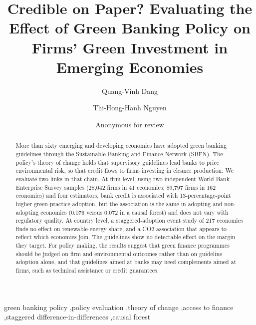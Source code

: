 \documentclass[review,authoryear,12pt]{elsarticle}
\begin{document}
\begin{frontmatter}

\title{Credible on Paper? Evaluating the Effect of Green Banking Policy on Firms' Green Investment in Emerging Economies}

\ifdefined\withauthors
\author[buv]{Quang-Vinh Dang}
\author[bav]{Thi-Hong-Hanh Nguyen}
\address[buv]{British University Vietnam, Hung Yen, Vietnam}
\address[bav]{Banking Academy Vietnam, Hanoi, Vietnam}
\else
\author{Anonymous for review}
\fi

\begin{abstract}
More than sixty emerging and developing economies have adopted green banking guidelines through the Sustainable Banking and Finance Network (SBFN). The policy's theory of change holds that supervisory guidelines lead banks to price environmental risk, so that credit flows to firms investing in cleaner production. We evaluate two links in that chain. At firm level, using two independent World Bank Enterprise Survey samples (28{,}042 firms in 41 economies; 89{,}797 firms in 162 economies) and four estimators, bank credit is associated with 13-percentage-point higher green-practice adoption, but the association is the same in adopting and non-adopting economies (0.076 versus 0.072 in a causal forest) and does not vary with regulatory quality. At country level, a staggered-adoption event study of 217 economies finds no effect on renewable-energy share, and a CO2 association that appears to reflect which economies join. The guidelines show no detectable effect on the margin they target. For policy making, the results suggest that green finance programmes should be judged on firm and environmental outcomes rather than on guideline adoption alone, and that guidelines aimed at banks may need complements aimed at firms, such as technical assistance or credit guarantees.
\end{abstract}

\begin{keyword}
green banking policy \sep policy evaluation \sep theory of change \sep access to finance \sep staggered difference-in-differences \sep causal forest
\end{keyword}

\end{frontmatter}

\linenumbers
\end{document}
